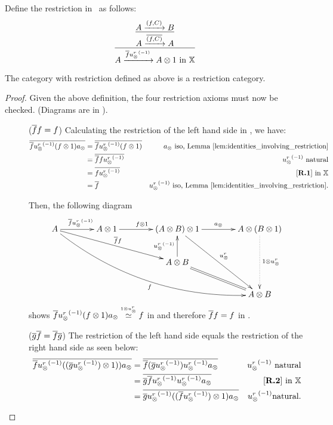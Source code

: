 Define the restriction in \Xt\ as follows:
\[
  \infer{A\xrightarrow{\restr{f}  \inv{u_{\*}^r}} A\*1 \text{ in }\X}
        {\infer{A\xrightarrow{\restr{(f,C)}}A}
               {A\xrightarrow{(f,C)}B}
        }
\]

\begin{lemma}\label{lem:xt_is_a_restriction_category}
  The category \Xt with restriction defined as above is a restriction category.
\end{lemma}
\begin{proof}

  Given the above definition, the four restriction axioms must now be checked. (Diagrams are in \X).
  \begin{description}
    \item[\rone] ($\overline{f} f = f$) Calculating the restriction of the left hand side in
      \X, we have:
      \begin{align*}
        \restr{\rst{f}\inv{\usr} (f\*1) a_{\*}} & = \restr{\rst{f}\inv{\usr} (f\*1)}
          & a_{\*}   \text{ iso, Lemma \ref{lem:identities_involving_restriction}}\\
        & = \restr{\rst{f}f \inv{\usr}}  & \inv{\usr} \text{ natural}\\
        & = \restr{f \inv{\usr}}  & \text{ \rone in }\X\\
        & = \restr{f } & \inv{\usr}   \text{ iso, Lemma \ref{lem:identities_involving_restriction}}.
      \end{align*}

      Then, the following diagram
      \[
        \xymatrix @C=40pt @R=25pt{
          A \ar[r]^{\restr{f} \inv{\usr}}
          \ar @/_25pt/[ddrrr]_f  \ar[drr]^{\restr{f}f}
          &A \* 1 \ar[r]^{f\* 1}
          &(A \* B) \* 1 \ar[r]^{a_{\*}} \ar[ddr]^{\usr}
          &A \* (B \* 1) \ar@{.>}[dd]^{1 \* {\usr}}\\
          &&A\*B \ar[u]^{\inv{\usr}} \ar@{=} [dr]\\
          && &A \* B
        }
      \]
      shows $\overline{f}{u_{\otimes}^r}^{(-1)} (f\otimes1) a_{\otimes} \overset{\scriptscriptstyle 1 \otimes {\ensuremath{u_{\otimes}^r}}}{\simeq} f$ in \X and therefore $\overline{f}f
      = f$ in \Xt.


    \item[\rtwo] ($\overline{g} \overline{f} = \overline{f} \overline{g}$) The restriction of the left hand
      side equals the restriction of the right hand side as seen below:
      \begin{align*}
        \restr{\rst{f}\inv{\usr} ((\restr{g}\inv\usr)\*1)) a_{\*}} & = \restr{\rst{f}(\restr{g}\inv\usr)\inv{\usr} a_{\*}} & \inv{\usr}   \text{ natural}\\
        & = \restr{\rst{g}\restr{f}\inv\usr\inv{\usr} a_{\*}} &  \text{\rtwo in }\X\\
        & = \restr{\rst{g}\inv{\usr}((\restr{f}\inv\usr)\*1) a_{\*}} & \inv{\usr}   \text{natural}.
      \end{align*}


\end{description}
\end{proof}
